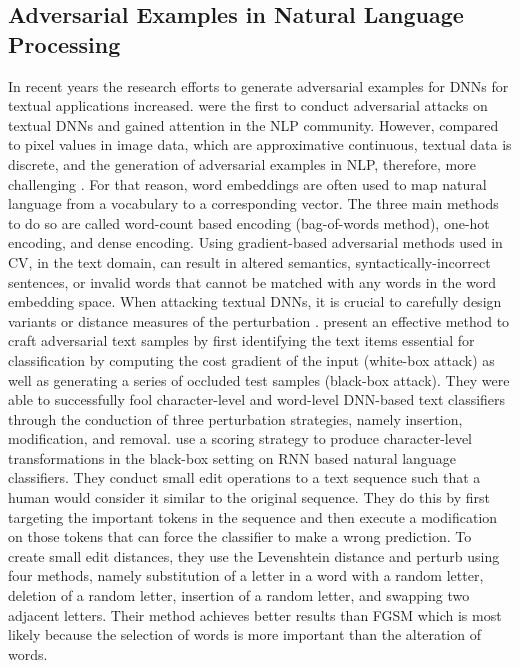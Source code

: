 \subsection{Adversarial Examples in Natural Language Processing}
In recent years the research efforts to generate adversarial examples for DNNs for textual applications increased. \cite{Jia2017AdversarialEF} were the first to conduct adversarial attacks on textual DNNs and gained attention in the NLP community. However, compared to pixel values in image data, which are approximative continuous, textual data is discrete, and the generation of adversarial examples in NLP, therefore, more challenging \cite{carlini2018audio}. For that reason, word embeddings are often used to map natural language from a vocabulary to a corresponding vector. The three main methods to do so are called word-count based encoding (bag-of-words method), one-hot encoding, and dense encoding.
Using gradient-based adversarial methods used in CV, in the text domain, can result in altered semantics, syntactically-incorrect sentences, or invalid words that cannot be matched with any words in the word embedding space. When attacking textual DNNs, it is crucial to carefully design variants or distance measures of the perturbation \cite{zhang2019adversarial}.
\cite{liang2017deep} present an effective method to craft adversarial text samples by first identifying the text items essential for classification by computing the cost gradient of the input (white-box attack) as well as generating a series of occluded test samples (black-box attack). They were able to successfully fool character-level and word-level DNN-based text classifiers through the conduction of three perturbation strategies, namely insertion, modification, and removal. 
\cite{gao2018black} use a scoring strategy to produce character-level transformations in the black-box setting on RNN based natural language classifiers. They conduct small edit operations to a text sequence such that a human would consider it similar to the original sequence. They do this by first targeting the important tokens in the sequence and then execute a modification on those tokens that can force the classifier to make a wrong prediction. To create small edit distances, they use the Levenshtein distance and perturb using four methods, namely substitution of a letter in a word with a random letter, deletion of a random letter, insertion of a random letter, and swapping two adjacent letters. Their method achieves better results than FGSM  which is most likely because the selection of words is more important than the alteration of words. 
